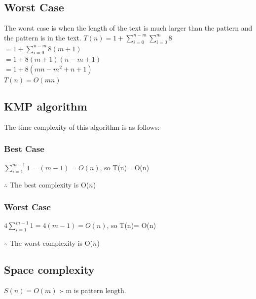 \documentclass{article}
\theoremstyle{plain}
\begin{document}
\subsection*{Worst Case}
The worst case is when the length of the text is much larger than the pattern and the pattern is in the text.
$T(n)= 1+ \sum_{i=0}^{n-m} \sum_{i=0}^{m} 8 $ \\
$= 1+ \sum_{i=0}^{n-m} 8(m+1)$\\
$= 1+ 8(m+1)(n-m+1)$\\
$= 1+ 8(mn-m^2+n+1)$\\
$T(n)= O(mn)$\\
\newpage
\subsection*{KMP algorithm}
The time complexity of this algorithm is as follows:-
\subsubsection*{Best Case}
$ \sum_{i=1}^{m-1} 1 = (m-1) = O(n)$,  so T(n)= O(n)

$\therefore$ The best complexity is O($n$)

\subsubsection*{Worst Case}
$ 4\sum_{i=1}^{m-1} 1 = 4(m-1) = O(n)$,  so T(n)= O(n)

$\therefore$ The worst complexity is O($n$)

\subsection*{Space complexity}
$S(n) = O(m)$ :- m is pattern length.
\newpage
\end{document}
